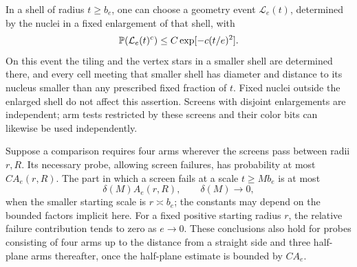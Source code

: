 \begin{lemma}\label{lem:localization}
In a shell of radius $t\ge b_e$, one can choose a geometry event
$\mathcal L_e(t)$, determined by the nuclei in a fixed enlargement of
that shell, with
\begin{equation}\label{eq:screen-failure}
 \mathbb P(\mathcal L_e(t)^c)\le C\exp[-c(t/e)^2].
\end{equation}
On this event the tiling and the vertex stars in a smaller shell are
determined there, and every cell meeting that smaller shell has
diameter and distance to its nucleus smaller than any prescribed
fixed fraction of $t$.  Fixed nuclei outside the enlarged shell do
not affect this assertion.  Screens with disjoint enlargements are
independent; arm tests restricted by these screens and their color
bits can likewise be used independently.

Suppose a comparison requires four arms wherever the screens pass
between radii $r,R$.  Its necessary probe, allowing screen failures,
has probability at most $C A_e(r,R)$.  The part in which a screen
fails at a scale $t\ge Mb_e$ is at most
\begin{equation}\label{eq:screen-relative-tail}
 \delta(M)A_e(r,R),\qquad \delta(M)\longrightarrow0,
\end{equation}
when the smaller starting scale is $r\asymp b_e$; the constants may
depend on the bounded factors implicit here.  For a fixed positive
starting radius $r$, the relative failure contribution tends to zero
as $e\to0$.  These conclusions also hold for probes consisting of
four arms up to the distance from a straight side and three
half-plane arms thereafter, once the half-plane estimate is bounded
by $C A_e$.
\end{lemma}

